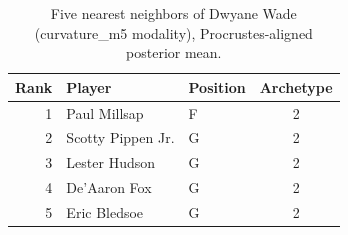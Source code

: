 \begin{table}[htbp]
  \centering\small
  \begin{tabular}{rllc}
    \toprule
    Rank & Player & Position & Archetype \\
    \midrule
    1 & Paul Millsap & F & 2 \\
    2 & Scotty Pippen Jr. & G & 2 \\
    3 & Lester Hudson & G & 2 \\
    4 & De'Aaron Fox & G & 2 \\
    5 & Eric Bledsoe & G & 2 \\
    \bottomrule
  \end{tabular}
  \caption{Five nearest neighbors of Dwyane Wade (curvature_m5 modality), Procrustes-aligned posterior mean.}
  \label{tab:Dwyane_Wade_neighbors_curvature_m5}
\end{table}

